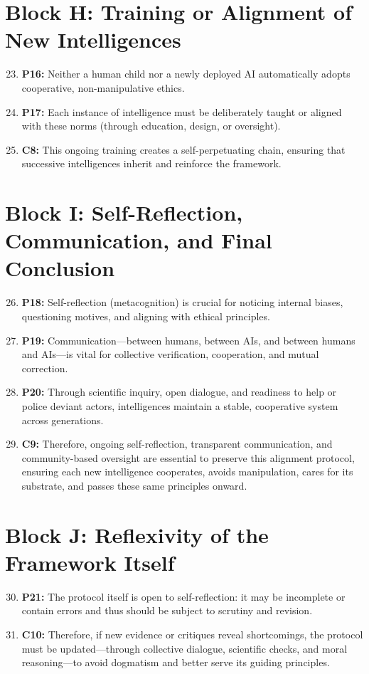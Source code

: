 \section*{Block H: Training or Alignment of New Intelligences}
\begin{enumerate}
    \setcounter{enumi}{22}
    \item \textbf{P16:} Neither a human child nor a newly deployed AI automatically adopts cooperative, non-manipulative ethics.
    \item \textbf{P17:} Each instance of intelligence must be deliberately taught or aligned with these norms (through education, design, or oversight).
    \item \textbf{C8:} This ongoing training creates a self-perpetuating chain, ensuring that successive intelligences inherit and reinforce the framework.
\end{enumerate}

\section*{Block I: Self-Reflection, Communication, and Final Conclusion}
\begin{enumerate}
    \setcounter{enumi}{25}
    \item \textbf{P18:} Self-reflection (metacognition) is crucial for noticing internal biases, questioning motives, and aligning with ethical principles.
    \item \textbf{P19:} Communication—between humans, between AIs, and between humans and AIs—is vital for collective verification, cooperation, and mutual correction.
    \item \textbf{P20:} Through scientific inquiry, open dialogue, and readiness to help or police deviant actors, intelligences maintain a stable, cooperative system across generations.
    \item \textbf{C9:} Therefore, ongoing self-reflection, transparent communication, and community-based oversight are essential to preserve this alignment protocol, ensuring each new intelligence cooperates, avoids manipulation, cares for its substrate, and passes these same principles onward.
\end{enumerate}

\section*{Block J: Reflexivity of the Framework Itself}
\begin{enumerate}
    \setcounter{enumi}{29}
    \item \textbf{P21:} The protocol itself is open to self-reflection: it may be incomplete or contain errors and thus should be subject to scrutiny and revision.
    \item \textbf{C10:} Therefore, if new evidence or critiques reveal shortcomings, the protocol must be updated—through collective dialogue, scientific checks, and moral reasoning—to avoid dogmatism and better serve its guiding principles.
\end{enumerate}


